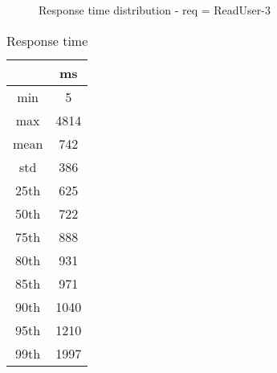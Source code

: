 \begin{minipage}{0.75\linewidth}
\begin{figure}[h]
\begin{adjustbox}{max width=1.0\linewidth, keepaspectratio}
  \end{adjustbox}
  \caption{Response time distribution - req = ReadUser-3}
\end{figure}
\end{minipage}\hfill\begin{minipage}{0.18\linewidth}
\begin{table}[h]
\begin{tabular}{|cc|}
\hline
\textbf{} & \textbf{ms}\\ \hline
 \Xhline{0.005\arrayrulewidth}
min & 5\\
 \Xhline{0.005\arrayrulewidth}
max & 4814\\
 \Xhline{0.005\arrayrulewidth}
mean & 742\\
 \Xhline{0.005\arrayrulewidth}
std & 386\\
\hline
\hline
 \Xhline{0.005\arrayrulewidth}
25th & 625\\
 \Xhline{0.005\arrayrulewidth}
50th & 722\\
 \Xhline{0.005\arrayrulewidth}
75th & 888\\
 \Xhline{0.005\arrayrulewidth}
80th & 931\\
 \Xhline{0.005\arrayrulewidth}
85th & 971\\
 \Xhline{0.005\arrayrulewidth}
90th & 1040\\
 \Xhline{0.005\arrayrulewidth}
95th & 1210\\
 \Xhline{0.005\arrayrulewidth}
99th & 1997\\
\hline
\end{tabular}
\caption{Response time}
\end{table}
\end{minipage}\hfill